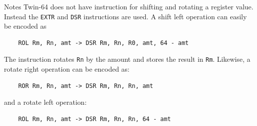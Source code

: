 \begin{iPageDescEntry}{Notes}
Twin-64 does not have instruction for shifting and rotating a register value. Instead the \texttt{EXTR} and \texttt{DSR} instructions are used. A shift left operation can easily be encoded as

\begin{verbatim}
    ROL Rm, Rn, amt -> DSR Rm, Rn, R0, amt, 64 - amt
\end{verbatim}

The instruction rotates \texttt{Rn} by the amount and stores the result in \texttt{Rm}. Likewise, a rotate right operation can be encoded as:

\begin{verbatim}
    ROR Rm, Rn, amt -> DSR Rm, Rn, Rn, amt
\end{verbatim}

and a rotate left operation: 

\begin{verbatim}
    ROL Rm, Rn, amt -> DSR Rm, Rn, Rn, 64 - amt
\end{verbatim}

\end{iPageDescEntry}
